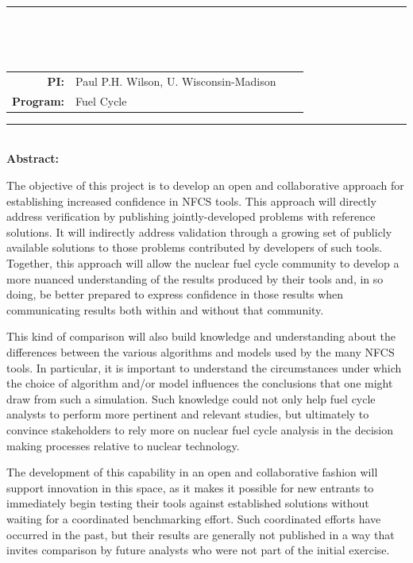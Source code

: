 \documentclass[dvips,12pt]{article}
\begin{document}
\vspace*{0.5in}

\noindent\rule{\textwidth}{1pt}\

\vspace*{0.2in}

\begin{centering}
  \textbf{\large \mytitle}\\
\end{centering}

\vspace*{0.25in}

\noindent
\begin{tabularx}{\textwidth}{rlrl}
   \textbf{PI:} & Paul P.H. Wilson, U. Wisconsin-Madison \\
   \textbf{Program:} & Fuel Cycle
\end{tabularx}



\vspace{0.2in}
\noindent\rule{\textwidth}{1pt}\\

\noindent\textbf{Abstract:} 

The objective of this project is to develop an open and collaborative approach
for establishing increased confidence in \gls{NFCS} tools. This approach will
directly address verification by publishing jointly-developed problems with
reference solutions.  It will indirectly address validation through a growing
set of publicly available solutions to those problems contributed by
developers of such tools.  Together, this approach will allow the nuclear
fuel cycle community to develop a more nuanced understanding of the results
produced by their tools and, in so doing, be better prepared to express
confidence in those results when communicating results both within and without
that community.

This kind of comparison will also build knowledge and understanding about the
differences between the various algorithms and models used by the many
\gls{NFCS} tools. In particular, it is important to understand the
circumstances under which the choice of algorithm and/or model influences the
conclusions that one might draw from such a simulation. Such knowledge could
not only help fuel cycle analysts to perform more pertinent and relevant
studies, but ultimately to convince stakeholders to rely more on nuclear fuel
cycle analysis in the decision making processes relative to nuclear
technology.

The development of this capability in an open and collaborative fashion will
support innovation in this space, as it makes it possible for new entrants to
immediately begin testing their tools against established solutions without
waiting for a coordinated benchmarking effort.  Such coordinated efforts have
occurred in the past, but their results are generally not published in a way
that invites comparison by future analysts who were not part of the initial
exercise.
\end{document}
